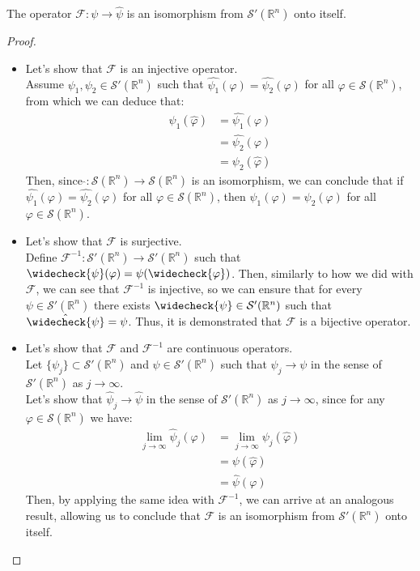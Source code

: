 \begin{theorem}{}
  The operator $\mathcal{F}:\psi\rightarrow \hat{\psi}$ is an isomorphism from $\mathcal{S}'(\mathbb{R}^n)$ onto itself.
\end{theorem}
\begin{proof}{}
  \begin{itemize}
    \item Let’s show that $\mathcal{F}$ is an injective operator.\\
      Assume $\psi_1,\psi_2\in\mathcal{S}'(\mathbb{R}^n)$ such that $\hat{\psi_1}(\varphi)=\hat{\psi_2}(\varphi)$ for all $\varphi\in\mathcal{S}(\mathbb{R}^n)$, from which we can deduce that:
      \begin{align*}
        \psi_1(\hat{\varphi})&=\hat{\psi_1}(\varphi)\\
        &=\hat{\psi_2}(\varphi)\\
        &=\psi_2(\hat{\varphi})				
      \end{align*}
      Then, since \hspace*{0.1cm}$\hat{} :\mathcal{S}(\mathbb{R}^n)\rightarrow\mathcal{S}(\mathbb{R}^n)$ is an isomorphism, we can conclude that if $\hat{\psi_1}(\varphi)=\hat{\psi_2}(\varphi)$ for all $\varphi\in\mathcal{S}(\mathbb{R}^n)$, then $\psi_1(\varphi)=\psi_2(\varphi)$ for all $\varphi\in\mathcal{S}(\mathbb{R}^n)$.
    \item Let’s show that $\mathcal{F}$ is surjective.\\
      Define $\mathcal{F}^{-1}:\mathcal{S}'(\mathbb{R}^n)\rightarrow\mathcal{S}'(\mathbb{R}^n)$ such that $\widecheck{\psi}(\varphi)=\psi(\widecheck{\varphi})$. Then, similarly to how we did with $\mathcal{F}$, we can see that $\mathcal{F}^{-1}$ is injective, so we can ensure that for every $\psi\in\mathcal{S}'(\mathbb{R}^n)$ there exists $\widecheck{\psi}\in\mathcal{S}'(\mathbb{R}^n)$ such that $\hat{\widecheck{\psi}}=\psi$. Thus, it is demonstrated that $\mathcal{F}$ is a bijective operator.
    \item Let’s show that $\mathcal{F}$ and $\mathcal{F}^{-1}$ are continuous operators.\\
      Let $\{\psi_j\}\subset\mathcal{S}'(\mathbb{R}^n)$ and $\psi\in\mathcal{S}'(\mathbb{R}^n)$ such that $\psi_j\rightarrow \psi$ in the sense of $\mathcal{S}'(\mathbb{R}^n)$ as $j\rightarrow \infty$.\\
      Let’s show that $\hat{\psi}_j\rightarrow \hat{\psi}$ in the sense of $\mathcal{S}'(\mathbb{R}^n)$ as $j\rightarrow \infty$, since for any $\varphi\in\mathcal{S}(\mathbb{R}^n)$ we have:
      \begin{align*}
        \lim_{j\rightarrow \infty}\hat{\psi}_j(\varphi)&=\lim_{j\rightarrow \infty}\psi_j(\hat{\varphi})\\
        &=\psi(\hat{\varphi})\\
        &=\hat{\psi}(\varphi)
      \end{align*}
      Then, by applying the same idea with $\mathcal{F}^{-1}$, we can arrive at an analogous result, allowing us to conclude that $\mathcal{F}$ is an isomorphism from $\mathcal{S}'(\mathbb{R}^n)$ onto itself.
  \end{itemize}
\end{proof}
